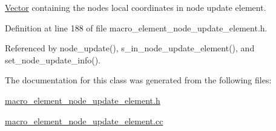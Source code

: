 \hyperlink{classoomph_1_1Vector}{Vector} containing the node\textquotesingle{}s local coordinates in node update element. 



Definition at line 188 of file macro\+\_\+element\+\_\+node\+\_\+update\+\_\+element.\+h.



Referenced by node\+\_\+update(), s\+\_\+in\+\_\+node\+\_\+update\+\_\+element(), and set\+\_\+node\+\_\+update\+\_\+info().



The documentation for this class was generated from the following files\+:\begin{DoxyCompactItemize}
\item 
\hyperlink{macro__element__node__update__element_8h}{macro\+\_\+element\+\_\+node\+\_\+update\+\_\+element.\+h}\item 
\hyperlink{macro__element__node__update__element_8cc}{macro\+\_\+element\+\_\+node\+\_\+update\+\_\+element.\+cc}\end{DoxyCompactItemize}

